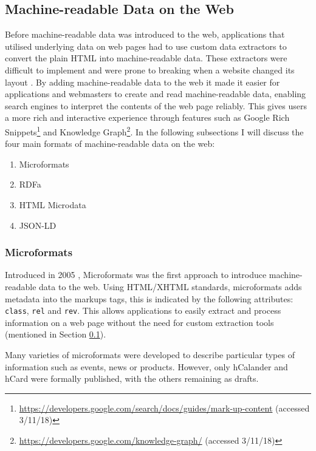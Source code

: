 \subsection{Machine-readable Data on the Web}
\label{sec:machinereadable}
Before machine-readable data was introduced to the web, applications that utilised underlying data on web pages had to use custom data extractors to convert the plain HTML into machine-readable data. These extractors were difficult to implement and were prone to breaking when a website changed its layout \cite{guha2016schema}. By adding machine-readable data to the web it made it easier for applications and webmasters to create and read machine-readable data, enabling search engines to interpret the contents of the web page reliably. This gives users a more rich and interactive experience through features such as Google Rich Snippets\footnote{\url{https://developers.google.com/search/docs/guides/mark-up-content} (accessed 3/11/18)} and Knowledge Graph\footnote{\url{https://developers.google.com/knowledge-graph/} (accessed 3/11/18)}. In the following subsections I will discuss the four main formats of machine-readable data on the web:\newline

{
\begin{enumerate}
    \item Microformats
    \item RDFa
    \item HTML Microdata 
    \item JSON-LD 
\end{enumerate}
}

\subsubsection{Microformats}
Introduced in 2005 \cite{microformasIntroduction}, Microformats was the first approach to introduce machine-readable data to the web. Using HTML/XHTML standards, microformats adds metadata into the markups tags, this is indicated by the following attributes: \texttt{class}, \texttt{rel} and \texttt{rev}. This allows applications to easily extract and process information on a web page without the need for custom extraction tools (mentioned in  Section \ref{sec:machinereadable}). 

Many varieties of microformats were developed to describe particular types of information such as events, news or products. However, only hCalander \cite{hcalanderMicroformat} and hCard \cite{hcardMicroformat} were formally published, with the others remaining as drafts.


